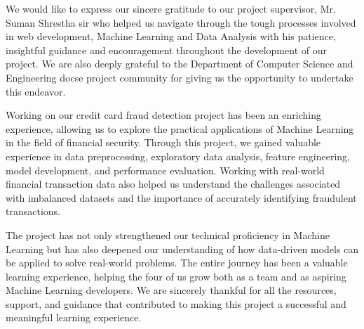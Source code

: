 We would like to express our sincere gratitude to our project supervisor, Mr. Suman Shrestha sir who helped us navigate through the tough processes involved in web development, Machine Learning and Data Analysis with his patience, insightful guidance and encouragement throughout the development of our project. We are also deeply grateful to the Department of Computer Science and Engineering \gls{docse} project community for giving us the opportunity to 
undertake this endeavor.

Working on our credit card fraud detection project has been an enriching experience, allowing us to explore the practical applications of Machine Learning in the field of financial security. Through this project, we gained valuable experience in data preprocessing, exploratory data analysis, feature engineering, model development, and performance evaluation. Working with real-world financial transaction data also helped us understand the challenges associated with imbalanced datasets and the importance of accurately identifying fraudulent transactions.

The project has not only strengthened our technical proficiency in Machine Learning but has also deepened our understanding of how data-driven models can be applied to solve real-world problems. The entire journey has been a valuable learning experience, helping the four of us grow both as a team and as aspiring Machine Learning developers. We are sincerely thankful for all the resources, support, and guidance that contributed to making this project a successful and meaningful learning experience.
